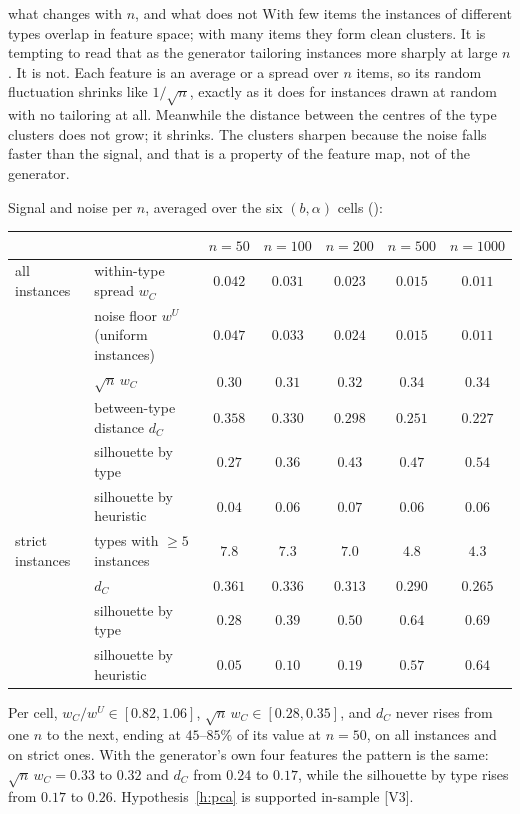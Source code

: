 \documentclass[a4paper,11pt]{article}
\newcommand{\code}[1]{\path{#1}}
\newcommand{\evid}[1]{\textcolor{inkSoft}{\scriptsize[#1]}}
\theoremstyle{plain}
\theoremstyle{definition}
\theoremstyle{remark}
\begin{document}
\begin{plain}{what changes with $n$, and what does not}
With few items the instances of different types overlap in feature space; with many items
they form clean clusters. It is tempting to read that as the generator tailoring instances
more sharply at large $n$. It is not. Each feature is an average or a spread over $n$ items,
so its random fluctuation shrinks like $1/\sqrt n$, exactly as it does for instances drawn at
random with no tailoring at all. Meanwhile the distance between the centres of the type
clusters does not grow; it shrinks. The clusters sharpen because the noise falls faster than
the signal, and that is a property of the feature map, not of the generator.
\end{plain}

Signal and noise per $n$, averaged over the six $(b,\alpha)$ cells
(\code{runs/pisinger_main/pca/separation.csv}):

\begin{center}\small
\begin{tabular}{@{}llccccc@{}}
\toprule
& & $n=50$ & $n=100$ & $n=200$ & $n=500$ & $n=1000$ \\
\midrule
all instances & within-type spread $w_C$ & $0.042$ & $0.031$ & $0.023$ & $0.015$ & $0.011$ \\
& noise floor $w^{U}$ (uniform instances) & $0.047$ & $0.033$ & $0.024$ & $0.015$ & $0.011$ \\
& $\sqrt n\,w_C$ & $0.30$ & $0.31$ & $0.32$ & $0.34$ & $0.34$ \\
& between-type distance $d_C$ & $0.358$ & $0.330$ & $0.298$ & $0.251$ & $0.227$ \\
& silhouette by type & $0.27$ & $0.36$ & $0.43$ & $0.47$ & $0.54$ \\
& silhouette by heuristic & $0.04$ & $0.06$ & $0.07$ & $0.06$ & $0.06$ \\
\addlinespace[2pt]
strict instances & types with $\ge5$ instances & $7.8$ & $7.3$ & $7.0$ & $4.8$ & $4.3$ \\
& $d_C$ & $0.361$ & $0.336$ & $0.313$ & $0.290$ & $0.265$ \\
& silhouette by type & $0.28$ & $0.39$ & $0.50$ & $0.64$ & $0.69$ \\
& silhouette by heuristic & $0.05$ & $0.10$ & $0.19$ & $0.57$ & $0.64$ \\
\bottomrule
\end{tabular}
\end{center}

Per cell, $w_C/w^{U}\in[0.82,1.06]$, $\sqrt n\,w_C\in[0.28,0.35]$, and $d_C$ never rises from
one $n$ to the next, ending at $45$--$85\%$ of its value at $n=50$, on all instances and on
strict ones. With the generator's own four features the pattern is the same:
$\sqrt n\,w_C=0.33$ to $0.32$ and $d_C$ from $0.24$ to $0.17$, while the silhouette by type
rises from $0.17$ to $0.26$. Hypothesis~\ref{h:pca} is supported in-sample \evid{V3}.
\end{document}
